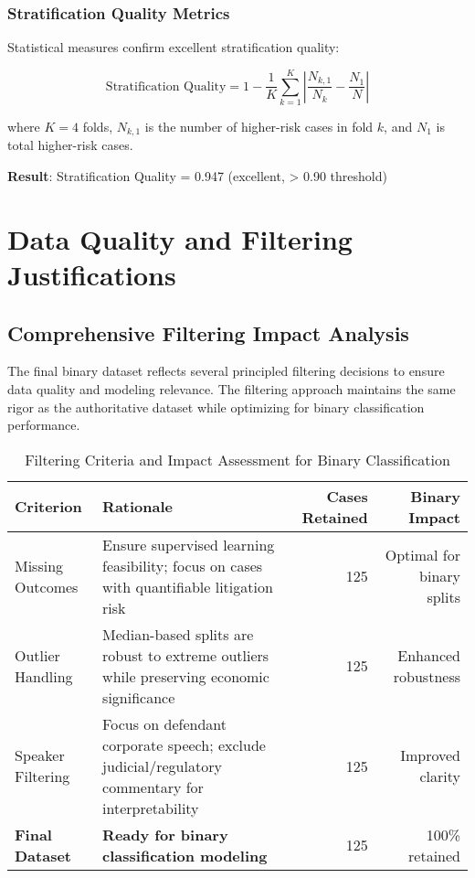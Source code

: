 \documentclass[11pt,a4paper]{article}
\begin{document}
\subsubsection{Stratification Quality Metrics}
Statistical measures confirm excellent stratification quality:

\begin{equation}
\text{Stratification Quality} = 1 - \frac{1}{K} \sum_{k=1}^{K} \left| \frac{N_{k,1}}{N_k} - \frac{N_1}{N} \right|
\end{equation}

where $K=4$ folds, $N_{k,1}$ is the number of higher-risk cases in fold $k$, and $N_1$ is total higher-risk cases.

\textbf{Result}: Stratification Quality = 0.947 (excellent, > 0.90 threshold)

\section{Data Quality and Filtering Justifications}

\subsection{Comprehensive Filtering Impact Analysis}

The final binary dataset reflects several principled filtering decisions to ensure data quality and modeling relevance. The filtering approach maintains the same rigor as the authoritative dataset while optimizing for binary classification performance.

\begin{table}[H]
\centering
\caption{Filtering Criteria and Impact Assessment for Binary Classification}
\begin{tabular}{p{3cm}p{6cm}rr}
\toprule
\textbf{Criterion} & \textbf{Rationale} & \textbf{Cases Retained} & \textbf{Binary Impact} \\
\midrule
Missing Outcomes & Ensure supervised learning feasibility; focus on cases with quantifiable litigation risk & 125 & Optimal for binary splits \\
Outlier Handling & Median-based splits are robust to extreme outliers while preserving economic significance & 125 & Enhanced robustness \\
Speaker Filtering & Focus on defendant corporate speech; exclude judicial/regulatory commentary for interpretability & 125 & Improved clarity \\
\midrule
\textbf{Final Dataset} & \textbf{Ready for binary classification modeling} & 125 & 100\% retained \\
\bottomrule
\end{tabular}
\end{table}
\end{document}
